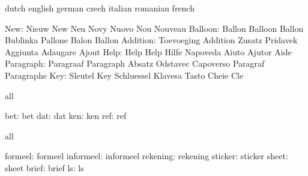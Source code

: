\stopvariables


\startvariables            dutch                     english
                           german                    czech
                           italian                   romanian
                           french

                      New: Nieuw                     New
                           Neu                       Novy
                           Nuovo                     Nou
                           Nouveau
                  Balloon: Ballon                    Balloon
                           Ballon                    Bublinka
                           Pallone                   Balon
                           Ballon
                 Addition: Toevoeging                Addition
                           Zusatz                    Pridavek
                           Aggiunta                  Adaugare
                           Ajout
                     Help: Help                      Help
                           Hilfe                     Napoveda
                           Aiuto                     Ajutor
                           Aide
                Paragraph: Paragraaf                 Paragraph
                           Absatz                    Odstavec
                           Capoverso                 Paragraf
                           Paragraphe
                      Key: Sleutel                   Key
                           Schluessel                Klavesa
                           Tasto                     Cheie
                           Cle
\stopvariables




\startconstants            all

                      bet: bet
                      dat: dat
                      ken: ken
                      ref: ref

\stopconstants

\startvariables            all

                  formeel: formeel
                informeel: informeel
                 rekening: rekening
                  sticker: sticker
                    sheet: sheet
                    brief: brief
                       ls: ls

\stopvariables

\stoplogginginterface

\endinput
